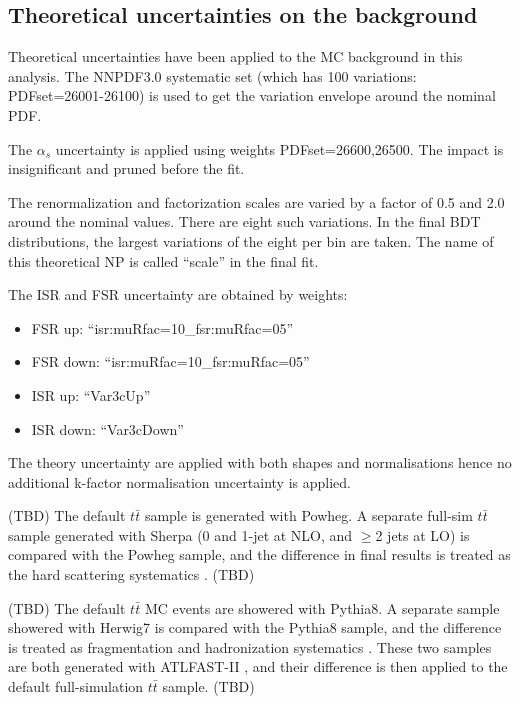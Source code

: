 \subsection{Theoretical uncertainties on the background}

Theoretical uncertainties have been applied to the MC background in this analysis. The NNPDF3.0 systematic set (which has 100 variations: PDFset=26001-26100) is used to get the variation envelope around the nominal PDF.

The $\alpha_s$ uncertainty is applied using weights PDFset=26600,26500. The impact is insignificant and pruned before the fit.

The renormalization and factorization scales are varied by a factor of 0.5 and 2.0 around the nominal values. There are eight such variations. In the final BDT distributions, the largest variations of the eight per bin are taken. The name of this theoretical NP is called ``scale'' in the final fit.

The ISR and FSR uncertainty are obtained by weights:
\begin{itemize}
	\item FSR up: ``isr:muRfac=10\_fsr:muRfac=05''
	\item FSR down: ``isr:muRfac=10\_fsr:muRfac=05''
	\item ISR up: ``Var3cUp''
	\item ISR down: ``Var3cDown''
\end{itemize}

The theory uncertainty are applied with both shapes and normalisations hence no additional k-factor normalisation uncertainty is applied.

(TBD) The default $t\bar{t}$ sample is generated with Powheg. A separate full-sim $t\bar{t}$ sample generated with Sherpa (0 and 1-jet at NLO, and $\ge$2 jets at LO) is compared with the Powheg sample, and the difference in final results is treated as the hard scattering systematics \cite{ttbarSys}. (TBD)

(TBD) The default $t\bar{t}$ MC events are showered with Pythia8. A separate sample showered with Herwig7 is compared with the Pythia8 sample, and the difference is treated as fragmentation and hadronization systematics \cite{ttbarSys}. These two samples are both generated with ATLFAST-II \cite{AFII}, and their difference is then applied to the default full-simulation $t\bar{t}$ sample. (TBD)


